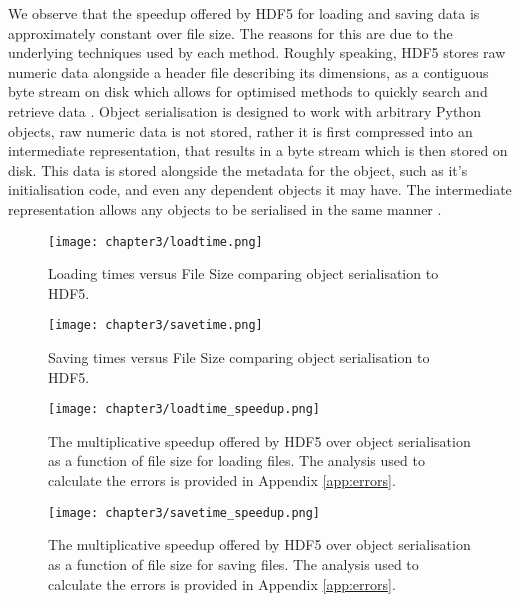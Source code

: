We observe that the speedup offered by HDF5 for loading and saving
data is approximately constant over file size. The reasons for this are due to the underlying
techniques used by each method. Roughly speaking, HDF5 stores raw numeric data
alongside a header file describing its dimensions, as a contiguous byte stream
on disk which allows for optimised methods to quickly search and retrieve data
\cite{collette2013python}. Object serialisation is designed to work with arbitrary
Python objects, raw numeric data is not stored, rather it is first compressed
into an intermediate representation, that results in a byte stream which is then
stored on disk. This data is stored alongside the metadata for the object, such
as it's initialisation code, and even any dependent objects it may have. The
intermediate representation allows any objects to be serialised in the same
manner \cite{pickle}.

\begin{figure}
    \centering

  {\texttt{[image: chapter3/loadtime.png]}}
  \vspace{0pt}
    \caption{
        Loading times versus File Size comparing object serialisation to HDF5.
    }
    \label{fig:3_1_loadtime}
\end{figure}


\begin{figure}
    \centering

  {\texttt{[image: chapter3/savetime.png]}}
  \vspace{0pt}
    \caption{
        Saving times versus File Size comparing object serialisation to HDF5.
    }
    \label{fig:3_1_savetime}
\end{figure}


\begin{figure}
    \centering

  {\texttt{[image: chapter3/loadtime\_speedup.png]}}
  \vspace{0pt}
    \caption{
        The multiplicative speedup offered by HDF5 over object serialisation
        as a function of file size for loading files.
        The analysis used to calculate the errors is provided in
        Appendix \ref{app:errors}.
    }
    \label{fig:3_1_loadtime_speedup}
\end{figure}


\begin{figure}
    \centering

  {\texttt{[image: chapter3/savetime\_speedup.png]}}
  \vspace{0pt}
    \caption{
        The multiplicative speedup offered by HDF5 over object serialisation
        as a function of file size for saving files.
        The analysis used to calculate the errors is provided in
        Appendix \ref{app:errors}.
    }
    \label{fig:3_1_savetime_speedup}
\end{figure}


